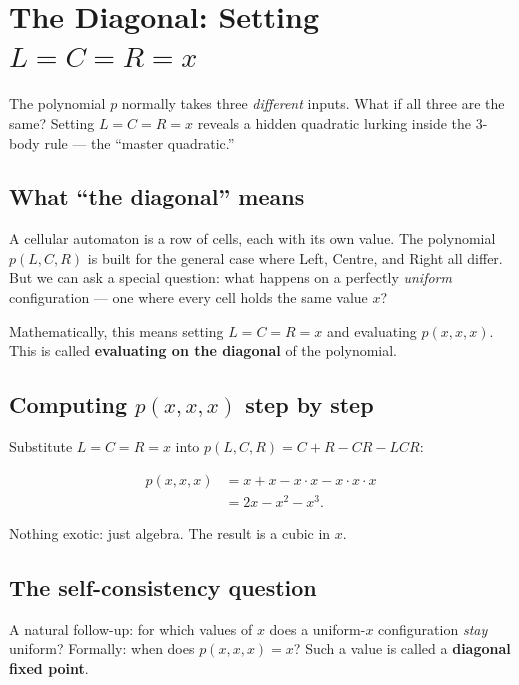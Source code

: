 \documentclass[11pt,a4paper]{article}
\newcommand{\term}[1]{\textbf{#1}}
\begin{document}
\section{The Diagonal: Setting \texorpdfstring{$L = C = R = x$}{L=C=R=x}}

\begin{tcolorbox}[colback=boxblue,colframe=blue!40!black,title=Key idea]
The polynomial $p$ normally takes three \emph{different} inputs.
What if all three are the same?
Setting $L = C = R = x$ reveals a hidden quadratic lurking inside
the 3-body rule — the ``master quadratic.''
\end{tcolorbox}

\subsection{What ``the diagonal'' means}

A cellular automaton is a row of cells, each with its own value.  The polynomial
$p(L,C,R)$ is built for the general case where Left, Centre, and Right all differ.
But we can ask a special question: what happens on a perfectly \emph{uniform}
configuration — one where every cell holds the same value $x$?

Mathematically, this means setting $L = C = R = x$ and evaluating $p(x,x,x)$.
This is called \term{evaluating on the diagonal} of the polynomial.

\subsection{Computing $p(x,x,x)$ step by step}

Substitute $L = C = R = x$ into $p(L,C,R) = C + R - CR - LCR$:

\begin{align*}
  p(x,x,x)
    &= x + x - x \cdot x - x \cdot x \cdot x \\
    &= 2x - x^2 - x^3.
\end{align*}

Nothing exotic: just algebra.  The result is a cubic in $x$.

\subsection{The self-consistency question}

A natural follow-up: for which values of $x$ does a uniform-$x$ configuration
\emph{stay} uniform?  Formally: when does $p(x,x,x) = x$?  Such a value is
called a \term{diagonal fixed point}.
\end{document}
